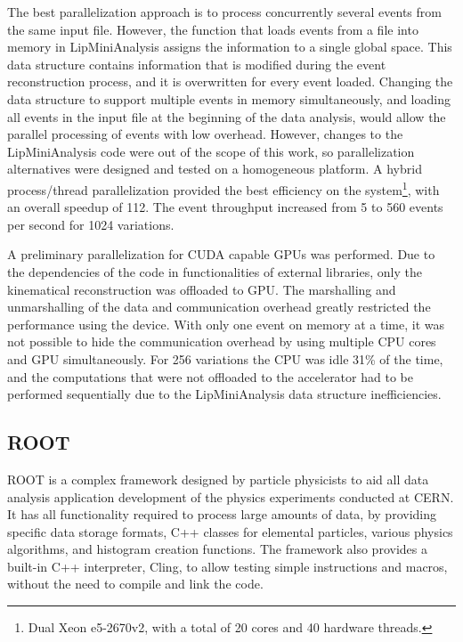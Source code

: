 The best parallelization approach is to process concurrently several events from the same input file. However, the function that loads events from a file into memory in LipMiniAnalysis assigns the information to a single global space. This data structure contains information that is modified during the event reconstruction process, and it is overwritten for every event loaded. Changing the data structure to support multiple events in memory simultaneously, and loading all events in the input file at the beginning of the data analysis, would allow the parallel processing of events with low overhead. However, changes to the LipMiniAnalysis code were out of the scope of this work, so parallelization alternatives were designed and tested on a homogeneous platform. A hybrid process/thread parallelization provided the best efficiency on the system\footnote{Dual \intel Xeon e5-2670v2, with a total of 20 cores and 40 hardware threads.}, with an overall speedup of 112. The event throughput increased from 5 to 560 events per second for 1024 variations.

A preliminary parallelization for CUDA capable GPUs was performed. Due to the dependencies of the code in functionalities of external libraries, only the kinematical reconstruction was offloaded to GPU. The marshalling and unmarshalling of the data and communication overhead greatly restricted the performance using the device. With only one event on memory at a time, it was not possible to hide the communication overhead by using multiple CPU cores and GPU simultaneously. For 256 variations the CPU was idle 31\% of the time, and the computations that were not offloaded to the accelerator had to be performed sequentially due to the LipMiniAnalysis data structure inefficiencies.

\subsection*{ROOT}

ROOT \cite{CERN:ROOT} is a complex framework designed by particle physicists to aid all data analysis application development of the physics experiments conducted at CERN. It has all functionality required to process large amounts of data, by providing specific data storage formats, C++ classes for elemental particles, various physics algorithms, and histogram creation functions. The framework also provides a built-in C++ interpreter, Cling, to allow testing simple instructions and macros, without the need to compile and link the code.

